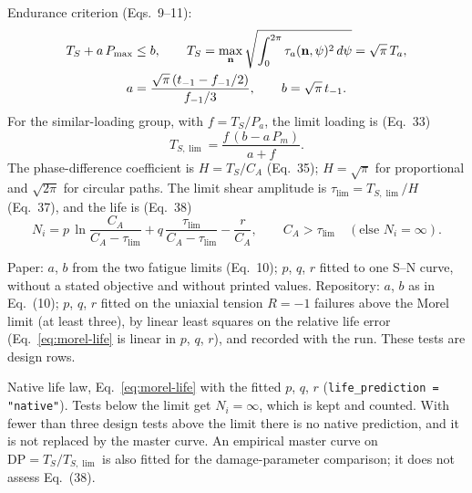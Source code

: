  Endurance criterion (Eqs.~9--11):
\begin{gather}
T_S + a\,P_{\max} \le b , \qquad
T_S = \max_{\mathbf n}\sqrt{\int_0^{2\pi}\tau_a(\mathbf n,\psi)^2\,d\psi} = \sqrt\pi\,T_a , \label{eq:morel-limit}\\
a = \frac{\sqrt\pi\,(t_{-1} - f_{-1}/2)}{f_{-1}/3} , \qquad b = \sqrt\pi\,t_{-1} . \label{eq:morel-ab}
\end{gather}
For the similar-loading group, with $f=T_S/P_a$, the limit loading is (Eq.~33)
\begin{equation}
T_{S,\lim} = \frac{f\,(b - a\,P_m)}{a + f} .
\label{eq:morel-tslim}
\end{equation}
The phase-difference coefficient is $H=T_S/C_A$ (Eq.~35); $H=\sqrt\pi$ for proportional and $\sqrt{2\pi}$
for circular paths. The limit shear amplitude is $\tau_{\lim}=T_{S,\lim}/H$ (Eq.~37), and the life is
(Eq.~38)
\begin{equation}
N_i = p\,\ln\frac{C_A}{C_A-\tau_{\lim}} + q\,\frac{\tau_{\lim}}{C_A-\tau_{\lim}} - \frac{r}{C_A} ,
\qquad C_A > \tau_{\lim}\quad(\text{else } N_i=\infty) .
\label{eq:morel-life}
\end{equation}

 Paper: $a$, $b$ from the two fatigue limits (Eq.~10); $p$, $q$, $r$
fitted to one S--N curve, without a stated objective and without printed values. Repository: $a$, $b$ as
in Eq.~(10); $p$, $q$, $r$ fitted on the uniaxial tension $R=-1$ failures above the Morel limit (at least
three), by linear least squares on the relative life error (Eq.~\eqref{eq:morel-life} is linear in $p$,
$q$, $r$), and recorded with the run. These tests are design rows.

 Native life law, Eq.~\eqref{eq:morel-life} with the fitted $p$, $q$, $r$
(\texttt{life\_prediction = "native"}). Tests below the limit get $N_i=\infty$, which is kept and
counted. With fewer than three design tests above the limit there is no native prediction, and it is
not replaced by the master curve. An empirical master curve on $\mathrm{DP}=T_S/T_{S,\lim}$ is also
fitted for the damage-parameter comparison; it does not assess Eq.~(38).

